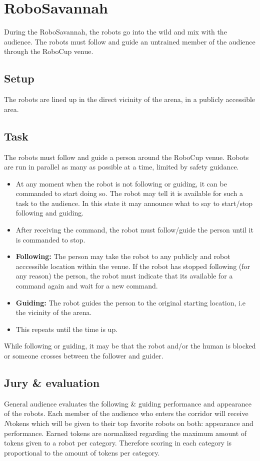 \newcommand{\roboSavannahTokens}{$N$}
\section{RoboSavannah}
\label{sec:test_robo_savannah}

During the RoboSavannah, the robots go into the wild and mix with the audience. The robots must follow and guide an untrained member of the audience through the RoboCup venue. 

\subsection{Setup}
The robots are lined up in the direct vicinity of the arena, in a publicly accessible area.

\subsection{Task}
The robots must follow and guide a person around the RoboCup venue. Robots are run in parallel as many as possible at a time, limited by safety guidance. 

\begin{itemize}
 \item  At any moment when the robot is not following or guiding, it can be commanded to start doing so. The robot may tell it is available for such a task to the audience.
	In this state it may announce what to say to start/stop following and guiding. 
 \item 	After receiving the command, the robot must follow/guide the person until it is commanded to stop. 
 \item \textbf{Following: }	The person may take the robot to any publicly and robot acccessible location within the venue. 
	If the robot has stopped following (for any reason) the person, the robot must indicate that its available for a command again and wait for a new command. 
 \item 	\textbf{Guiding: } 	The robot guides the person to the original starting location, i.e the vicinity of the arena. 
 \item 	This repeats until the time is up.
\end{itemize}

While following or guiding, it may be that the robot and/or the human is blocked or someone crosses between the follower and guider. 

\subsection{Jury \& evaluation}
General audience evaluates the following \& guiding performance and appearance of the robots. 
Each member of the audience who enters the corridor will receive \roboSavannahTokens tokens which will be given to their top favorite robots on both: appearance and performance. 
Earned tokens are normalized regarding the maximum amount of tokens given to a robot per category. 
Therefore scoring in each category is proportional to the amount of tokens per category.

